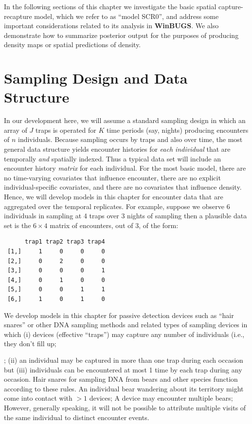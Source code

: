 In the following sections of this chapter we investigate the basic
spatial capture-recapture model, which we refer to as ``model SCR0'',  and address some important
considerations related to its analysis in {\bf WinBUGS}. We also demonstrate
how to summarize posterior output for the purposes of producing
density maps or spatial predictions of density.

\section{Sampling Design and Data Structure}

In our development here, we will assume a standard sampling design in
which an array of $J$ traps is operated for $K$ time periods (say,
nights) producing encounters of $n$ individuals.  Because sampling
occurs by traps and also over time, the most general data structure
yields encounter histories for {\it each individual} that are
temporally {\it and} spatially indexed. Thus a typical data set will
include an encounter history {\it matrix} for each individual.  For
the most basic model, there are no time-varying covariates that
influence encounter, there are no explicit individual-specific
covariates, and there are no covariates that influence density. Hence, we will
develop models in this chapter for encounter data that are aggregated
over the temporal replicates. For example, suppose we observe 6
individuals in sampling at 4 traps over 3 nights of sampling then a
plausible data set is the $6 \times 4$ matrix of encounters, out of 3,
of the form:
\begin{verbatim}
      trap1 trap2 trap3 trap4
 [1,]     1     0     0     0
 [2,]     0     2     0     0
 [3,]     0     0     0     1
 [4,]     0     1     0     0
 [5,]     0     0     1     1
 [6,]     1     0     1     0
\end{verbatim}

We develop models in this chapter for passive detection 
devices such as ``hair snares''
or other DNA sampling methods \citep{kery_etal:2010,
  gardner_etal:2010jwm} and related types of sampling devices in which
(i) devices (effective ``traps'') may capture any number of individuals (i.e.,
they don't fill up; ; (ii) an individual may be
captured in more than one trap during each occasion but (iii) 
individuals can be encountered at most 1 time by each trap during any
occasion.  Hair snares for sampling DNA from bears and other species
function according to these rules. An individual bear wandering about
its territory might come into contact with  $>1$ devices; A device may
encounter multiple bears; However, generally speaking, it will not be
possible to attribute multiple visits of the same individual to
distinct encounter events.

